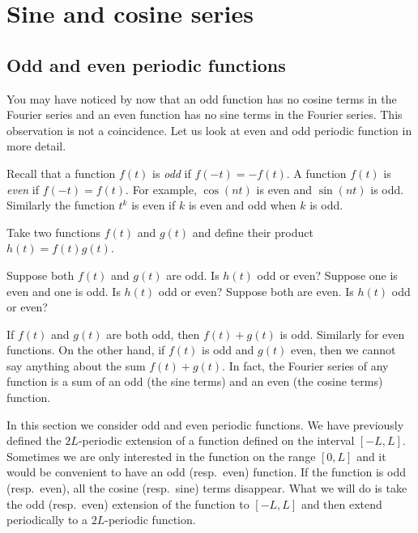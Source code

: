 
\sectionnewpage
\section{Sine and cosine series}
\label{sec:scs}


\subsection{Odd and even periodic functions}

You may have noticed by now that an odd function has no cosine terms in the 
Fourier series and an even function has no sine terms in the Fourier series.
This observation is not a coincidence.  Let us look at even and odd periodic
function in more detail.

Recall that a function $f(t)$ is \emph{odd} if $f(-t) =
-f(t)$.  A function $f(t)$ is \emph{even} if
$f(-t) = f(t)$.  For example, $\cos (n t)$ is even and $\sin (n t)$ is odd.
Similarly the function $t^k$ is even if $k$ is even and odd when $k$ is odd.

\begin{exercise}
Take two functions $f(t)$ and $g(t)$ and define their product $h(t) =
f(t)g(t)$.
\begin{tasks}
\task Suppose both $f(t)$ and $g(t)$ are odd.  Is $h(t)$ odd or even?
\task Suppose one is even and one is odd.  Is $h(t)$ odd or even?
\task Suppose both are even.  Is $h(t)$ odd or even?
\end{tasks}
\end{exercise}

If $f(t)$ and $g(t)$ are both odd, then $f(t)+g(t)$ is odd.  Similarly for
even functions.  On the other hand,
if $f(t)$ is odd and $g(t)$ even, then we cannot say anything about
the sum
$f(t) + g(t)$.  In fact, the Fourier series of any function is a sum of
an odd (the sine terms) and an even (the cosine terms) function.

In this section we consider odd and even periodic
functions.  We have previously defined the $2L$-periodic extension
of a function defined on the interval $[-L,L]$.  Sometimes we are only
interested in the function on the range $[0,L]$ and it would be convenient
to have an odd (resp.\ even) function.  If the function is odd (resp.\ even),
all the cosine (resp.\ sine) terms disappear.
What we will do is
take the
odd (resp.\ even) extension of the function to $[-L,L]$ and then 
extend periodically to a $2L$-periodic function.

